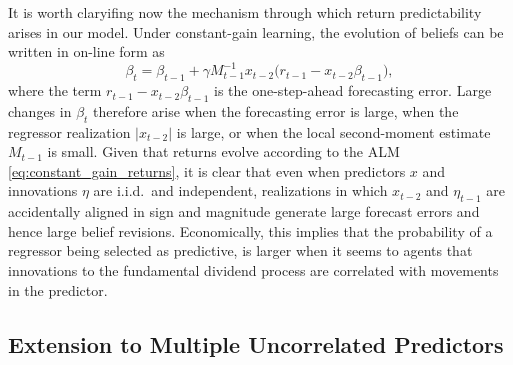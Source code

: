\documentclass[11pt]{article}
\begin{document}
It is worth claryifing now the mechanism through which return predictability arises in our model.
Under constant-gain learning, the evolution of beliefs can be written in on-line form as
\begin{equation}
\beta_t
=
\beta_{t-1}
+
\gamma M_{t-1}^{-1} x_{t-2}
\bigl(r_{t-1} - x_{t-2}\beta_{t-1}\bigr),
\end{equation}
where the term $r_{t-1} - x_{t-2}\beta_{t-1}$ is the one-step-ahead forecasting error.
Large changes in $\beta_t$ therefore arise when the forecasting error is large, when the regressor realization $|x_{t-2}|$ is large, or when the local second-moment estimate $M_{t-1}$ is small.
Given that returns evolve according to the ALM \eqref{eq:constant_gain_returns}, it is clear that 
even when predictors $x$ and innovations $\eta$ are i.i.d.\ and independent, realizations in which $x_{t-2}$ and $\eta_{t-1}$ are accidentally aligned in sign and magnitude generate large forecast errors and hence large belief revisions.
Economically, this implies that the probability of a regressor being selected as predictive, is larger when it seems to agents that innovations to the fundamental dividend process are correlated with movements in the predictor.

\subsection{Extension to Multiple Uncorrelated Predictors}
\end{document}
